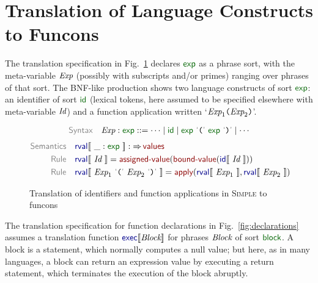 \documentclass[runningheads,fleqn]{llncs}
\begin{document}

\section{Translation of Language Constructs to Funcons}
\label{sec:languages}

The translation specification in Fig.~\ref{fig:expressions} declares $\SYN{exp}$ as a phrase sort,
with the meta-variable $\textit{Exp}$ (possibly with subscripts and/or primes)
ranging over phrases of that sort.
%
The BNF-like production shows two language constructs of sort $\SYN{exp}$:
an identifier of sort $\SYN{id}$
(lexical tokens, here assumed to be specified elsewhere with meta-variable $\textit{Id}$)
and a function application written `$\textit{Exp}_1 \texttt{(} \textit{Exp}_2\texttt{)}$'.

\begin{figure}
    \centering
\begin{align*}
  \KEY{Syntax} \quad
    \VAR{Exp} : \SYN{exp}
      ::=  \cdots 
      \mid \SYN{id}
      \mid \SYN{exp} \ \LEX{(} \ \SYN{exp} \ \LEX{)}
      \mid \cdots
\end{align*}
\begin{align*}
  \KEY{Semantics} \quad
  & \SEM{rval} \LEFTPHRASE \ \_ : \SYN{exp} \ \RIGHTPHRASE  
    :  \TO \NAME{values} 
\\
  \KEY{Rule} \quad
    & \SEM{rval} \LEFTPHRASE \ \VAR{Id} \  \RIGHTPHRASE  = 
      \NAME{assigned-value}
        (  \NAME{bound-value}
        ( \SEM{id} \LEFTPHRASE \ \VAR{Id} \ \RIGHTPHRASE  ) )
\\
  \KEY{Rule} \quad
    & \SEM{rval} \LEFTPHRASE \ \VAR{Exp}_1 \ \LEX{(} \ \VAR{Exp}_2 \ \LEX{)} \ \RIGHTPHRASE  = 
      \NAME{apply}
        (  \SEM{rval} \LEFTPHRASE \ \VAR{Exp}_1 \ \RIGHTPHRASE , 
               \SEM{rval} \LEFTPHRASE \ \VAR{Exp}_2 \ \RIGHTPHRASE  )
\end{align*}
%
    \caption{Translation of identifiers and function applications in \textsc{Simple} to funcons}
    \label{fig:expressions}
\end{figure}

The translation specification for function declarations in Fig.~\ref{fig:declarations}
assumes a translation function $\SEM{exec}\LEFTPHRASE \VAR{Block} \RIGHTPHRASE$ 
for phrases $\textit{Block}$ of sort $\SYN{block}$.
A block is a statement, which normally computes a null value;
but here, as in many languages, a block can return an expression value by executing a return statement,
which terminates the execution of the block abruptly.
\end{document}
